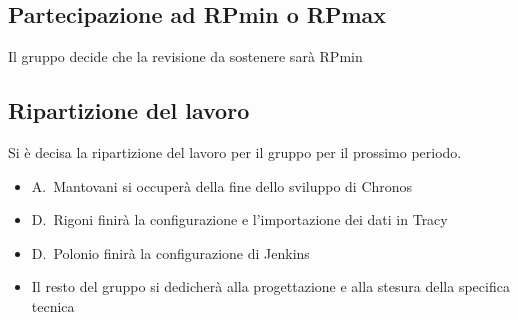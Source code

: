 \documentclass[11pt]{meetingmins}
\begin{document}
\subsection{Partecipazione ad RPmin o RPmax}

Il gruppo decide che la revisione da sostenere sarà RPmin

\subsection{Ripartizione del lavoro}

Si è decisa la ripartizione del lavoro per il gruppo per il prossimo periodo.

\begin{itemize}
\item A.~Mantovani si occuperà della fine dello sviluppo di Chronos
\item D.~Rigoni finirà la configurazione e l'importazione dei dati in Tracy
\item D.~Polonio finirà la configurazione di Jenkins
\item Il resto del gruppo si dedicherà alla progettazione e alla stesura della specifica tecnica
\end{itemize}

\end{document}

